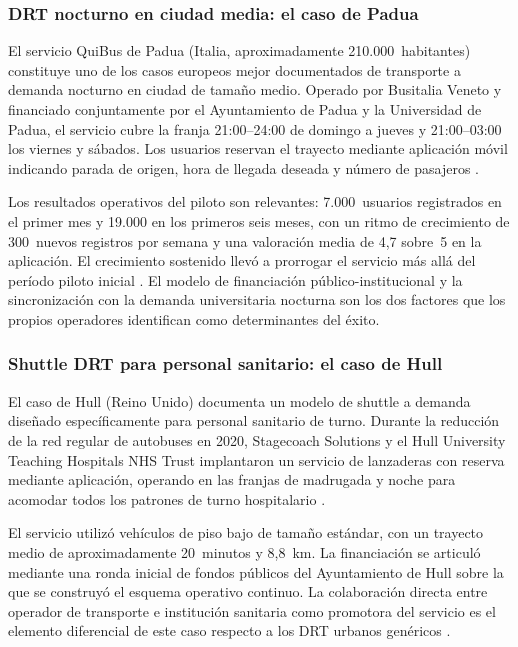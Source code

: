 \subsubsection{DRT nocturno en ciudad media: el caso de Padua}
\label{sec:caso-padua}

El servicio QuiBus de Padua (Italia, aproximadamente
210.000~habitantes) constituye uno de los casos europeos
mejor documentados de transporte a demanda nocturno en
ciudad de tamaño medio. Operado por Busitalia Veneto y
financiado conjuntamente por el Ayuntamiento de Padua
y la Universidad de Padua, el servicio cubre la franja
21:00--24:00 de domingo a jueves y 21:00--03:00 los
viernes y sábados. Los usuarios reservan el trayecto
mediante aplicación móvil indicando parada de origen,
hora de llegada deseada y número de pasajeros
\parencite{Busitalia2019QuiBus}.

Los resultados operativos del piloto son relevantes:
7.000~usuarios registrados en el primer mes y 19.000
en los primeros seis meses, con un ritmo de crecimiento
de 300~nuevos registros por semana y una valoración
media de 4{,}7 sobre~5 en la aplicación. El crecimiento
sostenido llevó a prorrogar el servicio más allá del
período piloto inicial \parencite{Busitalia2019QuiBus}.
El modelo de financiación público-institucional y la
sincronización con la demanda universitaria nocturna
son los dos factores que los propios operadores
identifican como determinantes del éxito.

\subsubsection{Shuttle DRT para personal sanitario: el caso de Hull}
\label{sec:caso-hull}

El caso de Hull (Reino Unido) documenta un modelo de
shuttle a demanda diseñado específicamente para personal
sanitario de turno. Durante la reducción de la red
regular de autobuses en 2020, Stagecoach Solutions y
el Hull University Teaching Hospitals NHS Trust
implantaron un servicio de lanzaderas con reserva
mediante aplicación, operando en las franjas de
madrugada y noche para acomodar todos los patrones
de turno hospitalario \parencite{Stagecoach2020Hull}.

El servicio utilizó vehículos de piso bajo de tamaño
estándar, con un trayecto medio de aproximadamente
20~minutos y 8{,}8~km. La financiación se articuló
mediante una ronda inicial de fondos públicos del
Ayuntamiento de Hull sobre la que se construyó el
esquema operativo continuo. La colaboración directa
entre operador de transporte e institución sanitaria
como promotora del servicio es el elemento diferencial
de este caso respecto a los DRT urbanos genéricos
\parencite{Stagecoach2020Hull}.

